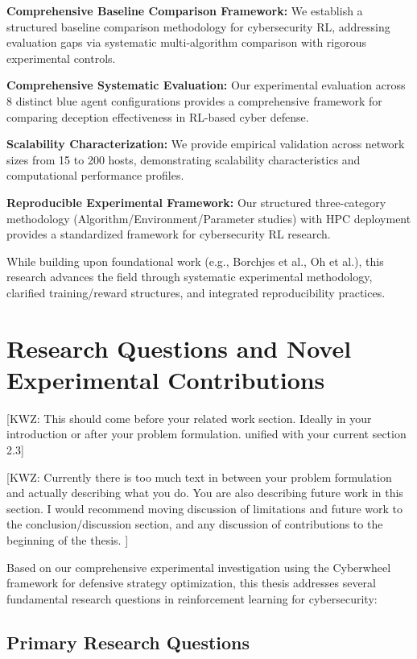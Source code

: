 \documentclass[12pt,oneside]{article}
\newcommand{\kwz}[1]{
  {\color{magenta} [KWZ: {#1}]}
 }
\begin{document}
\textbf{Comprehensive Baseline Comparison Framework:} We establish a structured baseline comparison methodology for cybersecurity RL, addressing evaluation gaps via systematic multi-algorithm comparison with rigorous experimental controls.

\textbf{Comprehensive Systematic Evaluation:} Our experimental evaluation across 8 distinct blue agent configurations provides a comprehensive framework for comparing deception effectiveness in RL-based cyber defense.

\textbf{Scalability Characterization:} We provide empirical validation across network sizes from 15 to 200 hosts, demonstrating scalability characteristics and computational performance profiles.

\textbf{Reproducible Experimental Framework:} Our structured three-category methodology (Algorithm/Environment/Parameter studies) with HPC deployment provides a standardized framework for cybersecurity RL research.

While building upon foundational work (e.g., Borchjes et al., Oh et al.), this research advances the field through systematic experimental methodology, clarified training/reward structures, and integrated reproducibility practices.

\section{Research Questions and Novel Experimental Contributions}

\kwz{This should come before your related work section. Ideally in your introduction or after your problem formulation. unified with your current section 2.3}

\kwz{Currently there is too much text in between your problem formulation and actually describing what you do. You are also describing future work in this section. I would recommend moving discussion of limitations and future work to the conclusion/discussion section, and any discussion of contributions to the beginning of the thesis. }

Based on our comprehensive experimental investigation using the Cyberwheel framework for defensive strategy optimization, this thesis addresses several fundamental research questions in reinforcement learning for cybersecurity:

\subsection{Primary Research Questions}
\end{document}
